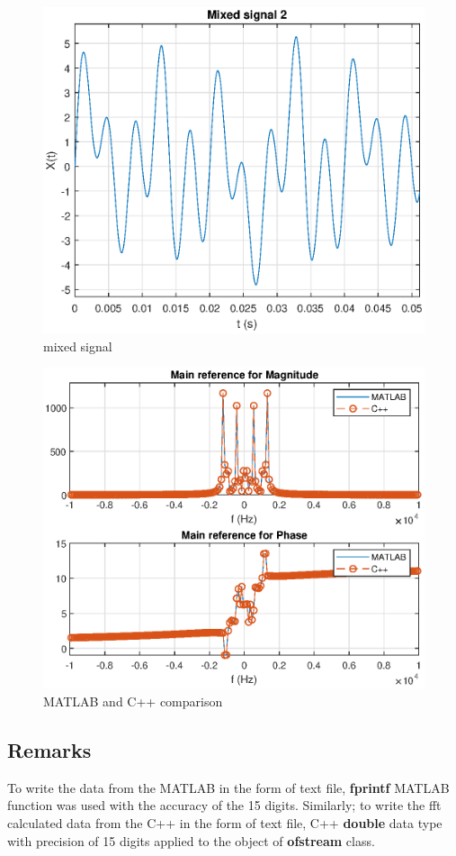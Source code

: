 \begin{refsection}
\begin{figure}[h]
	\centering
	\includegraphics[width=12cm]{./algorithms/fft/figures/mixed_signal.eps}
	\caption{mixed signal}\label{mixed_signal}
\end{figure}

\begin{figure}[h]
	\centering
	\includegraphics[width=12cm]{./algorithms/fft/figures/mixed_signal_fft.eps}
	\caption{MATLAB and C++ comparison}\label{mixed_signal_fft}
\end{figure}
\subsection*{Remarks}
To write the data from the MATLAB in the form of text file, \textbf{fprintf} MATLAB function was used with the accuracy of the 15 digits. Similarly; to write the fft calculated data from the C++ in the form of text file, C++ \textbf{double} data type with precision of 15 digits applied to the object of \textbf{ofstream} class.\

\end{refsection}
